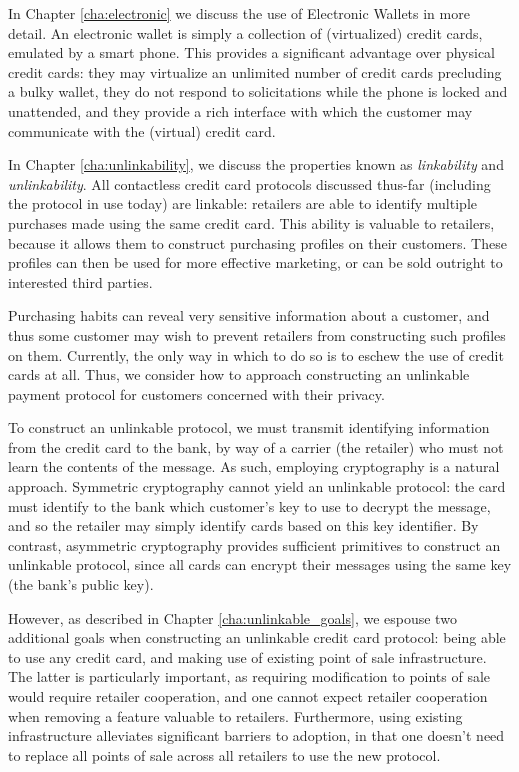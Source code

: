 
In Chapter \ref{cha:electronic} we discuss the use of Electronic Wallets in more detail.
An electronic wallet is simply a collection of (virtualized) credit cards, emulated by a smart phone.
This provides a significant advantage over physical credit cards:
    they may virtualize an unlimited number of credit cards precluding a bulky wallet,
    they do not respond to solicitations while the phone is locked and unattended,
    and they provide a rich interface with which the customer may communicate with the (virtual) credit card.


In Chapter \ref{cha:unlinkability}, we discuss the properties known as \emph{linkability} and \emph{unlinkability}.
All contactless credit card protocols discussed thus-far (including the protocol in use today) are linkable:
    retailers are able to identify multiple purchases made using the same credit card.
This ability is valuable to retailers, because it allows them to construct purchasing profiles on their customers.
These profiles can then be used for more effective marketing, or can be sold outright to interested third parties.

Purchasing habits can reveal very sensitive information about a customer,
    and thus some customer may wish to prevent retailers from constructing such profiles on them.
Currently, the only way in which to do so is to eschew the use of credit cards at all.
Thus, we consider how to approach constructing an unlinkable payment protocol for customers concerned with their privacy.

To construct an unlinkable protocol, we must transmit identifying information from the credit card to the bank,
    by way of a carrier (the retailer) who must not learn the contents of the message.
As such, employing cryptography is a natural approach.
Symmetric cryptography cannot yield an unlinkable protocol:
    the card must identify to the bank which customer's key to use to decrypt the message, and so the retailer may simply identify cards based on this key identifier.
By contrast, asymmetric cryptography provides sufficient primitives to construct an unlinkable protocol, since all cards can encrypt their messages using the same key (the bank's public key).


However, as described in Chapter \ref{cha:unlinkable_goals}, we espouse two additional goals when constructing an unlinkable credit card protocol:
    being able to use any credit card, and making use of existing point of sale infrastructure.
The latter is particularly important, as requiring modification to points of sale would require retailer cooperation,
    and one cannot expect retailer cooperation when removing a feature valuable to retailers.
Furthermore, using existing infrastructure alleviates significant barriers to adoption, in that one doesn't need to replace all points of sale across all retailers to use the new protocol.


